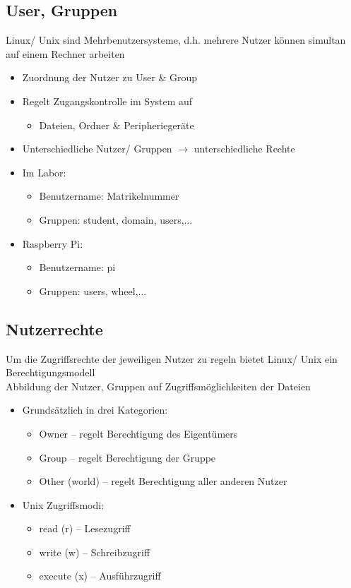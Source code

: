 \documentclass[xcolor=dvipsnames,aspectratio=169]{beamer}
\begin{document}
\subsection{User, Gruppen}
\begin{frame}
Linux/ Unix sind Mehrbenutzersysteme, d.h. mehrere Nutzer können simultan auf einem Rechner arbeiten
\begin{itemize}
	\item Zuordnung der Nutzer zu User \& Group
	\item Regelt Zugangskontrolle im System auf
	\begin{itemize}
	\item  Dateien, Ordner \& Peripheriegeräte
	\end{itemize}
	\item Unterschiedliche Nutzer/ Gruppen $\rightarrow$ unterschiedliche Rechte
	\item Im Labor:
	\begin{itemize}
		\item Benutzername: Matrikelnummer
		\item Gruppen: student, domain, users,...
	\end{itemize}
	\item Raspberry Pi:
	\begin{itemize}
		\item Benutzername: pi
		\item Gruppen: users, wheel,...
	\end{itemize}
\end{itemize}
\end{frame}

\subsection{Nutzerrechte}
\begin{frame}
Um die Zugriffsrechte der jeweiligen Nutzer zu regeln bietet Linux/ Unix ein Berechtigungsmodell\\
Abbildung der Nutzer, Gruppen auf Zugriffsmöglichkeiten der Dateien
\begin{itemize}
	\item Grundsätzlich in drei Kategorien:
	\begin{itemize}
		\item Owner -- regelt Berechtigung des Eigentümers
		\item Group -- regelt Berechtigung der Gruppe
		\item Other (world) -- regelt Berechtigung aller anderen Nutzer 
	\end{itemize}
	\item Unix Zugriffsmodi:
	\begin{itemize}
		\item read (r) -- Lesezugriff
		\item write (w) -- Schreibzugriff
		\item execute (x) -- Ausführzugriff
	\end{itemize}
\end{itemize}
\end{frame}
\end{document}
